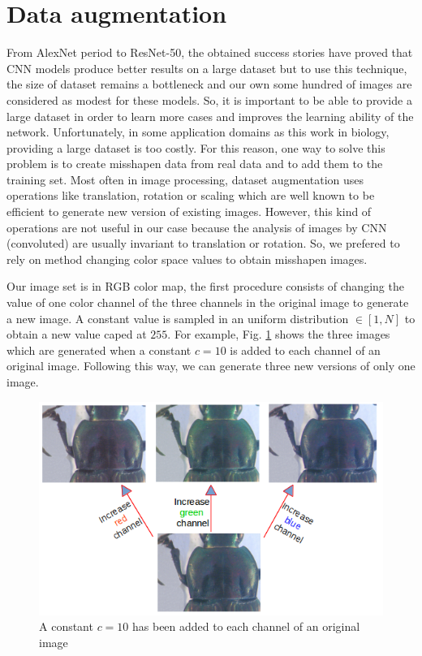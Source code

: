 \documentclass[review]{elsarticle}
\begin{document}
\section{Data augmentation}
\label{Sdataaug}
From AlexNet period to ResNet-50, the obtained success stories
\cite{krizhevsky2012imagenet,he2016deep} have proved that CNN models
produce better results on a large dataset but to use this technique,
the size of dataset remains a bottleneck and our own some hundred of
images are considered as modest for these models. So, it is important
to be able to provide a large dataset in order to learn more cases and
improves the learning ability of the network. Unfortunately, in some
application domains as this work in biology, providing a large dataset
is too costly. For this reason, one way to solve this problem is to
create misshapen data from real data and to add them to the training
set. Most often in image processing, dataset augmentation uses
operations like translation, rotation or scaling which are well known
to be efficient to generate new version of existing images. However,
this kind of operations are not useful in our case because the
analysis of images by CNN (convoluted) are usually invariant to
translation or rotation. So, we prefered to rely on method changing
color space values to obtain misshapen images.


Our image set is in RGB color map, the first procedure consists of
changing the value of one color channel of the three channels in the
original image to generate a new image. A constant value is sampled in
an uniform distribution $\in [1, N]$ to obtain a new value caped at
$255$. For example, Fig. \ref{figaug1} shows the three images which
are generated  when a constant $c = 10$ is added to each channel of an
original image. Following this way, we can generate three new versions
of only one image.


\begin{figure}[h]
	\centering
	\includegraphics[scale=0.4]{images/inc_channels}
	\caption{A constant $c = 10$ has been added to each channel of an original image}
	\label{figaug1}
\end{figure}
\end{document}
